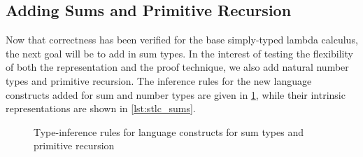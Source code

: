 \subsection{Adding Sums and Primitive Recursion}\label{sec:sum_prim}
  Now that correctness has been verified for the base simply-typed lambda calculus, the next goal will be to add in sum types.
  In the interest of testing the flexibility of both the representation and the proof technique, we also add natural number types and primitive recursion.
  The inference rules for the new language constructs added for sum and number types are given in \cref{fig:sum_prim_infer}, while their intrinsic representations are shown in \cref{lst:stlc_sums}.

  \begin{figure}
    \caption{Type-inference rules for language constructs for sum types and primitive recursion}
    \label{fig:sum_prim_infer}
  \end{figure}

